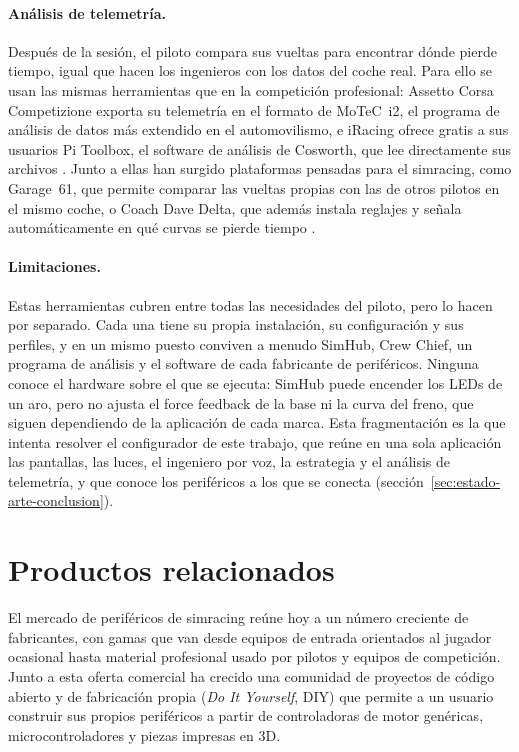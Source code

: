 \paragraph{Análisis de telemetría.}
Después de la sesión, el piloto compara sus vueltas para encontrar dónde pierde tiempo, igual que hacen los ingenieros con los datos del coche real. Para ello se usan las mismas herramientas que en la competición profesional: Assetto Corsa Competizione exporta su telemetría en el formato de MoTeC~i2, el programa de análisis de datos más extendido en el automovilismo, e iRacing ofrece gratis a sus usuarios Pi Toolbox, el software de análisis de Cosworth, que lee directamente sus archivos \parencite{acc_motec_blog, motec_i2, cosworth_iracing}. Junto a ellas han surgido plataformas pensadas para el simracing, como Garage~61, que permite comparar las vueltas propias con las de otros pilotos en el mismo coche, o Coach Dave Delta, que además instala reglajes y señala automáticamente en qué curvas se pierde tiempo \parencite{garage61_web, coachdave_delta}.

\paragraph{Limitaciones.}
Estas herramientas cubren entre todas las necesidades del piloto, pero lo hacen por separado. Cada una tiene su propia instalación, su configuración y sus perfiles, y en un mismo puesto conviven a menudo SimHub, Crew Chief, un programa de análisis y el software de cada fabricante de periféricos. Ninguna conoce el hardware sobre el que se ejecuta: SimHub puede encender los LEDs de un aro, pero no ajusta el force feedback de la base ni la curva del freno, que siguen dependiendo de la aplicación de cada marca. Esta fragmentación es la que intenta resolver el configurador de este trabajo, que reúne en una sola aplicación las pantallas, las luces, el ingeniero por voz, la estrategia y el análisis de telemetría, y que conoce los periféricos a los que se conecta (sección~\ref{sec:estado-arte-conclusion}).
\section{Productos relacionados}
\label{sec:productos-relacionados}

El mercado de periféricos de simracing reúne hoy a un número creciente de fabricantes, con gamas que van desde equipos de entrada orientados al jugador ocasional hasta material profesional usado por pilotos y equipos de competición. Junto a esta oferta comercial ha crecido una comunidad de proyectos de código abierto y de fabricación propia (\textit{Do It Yourself}, DIY) que permite a un usuario construir sus propios periféricos a partir de controladoras de motor genéricas, microcontroladores y piezas impresas en 3D.

